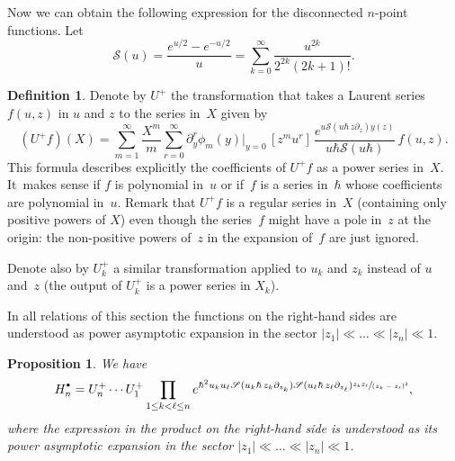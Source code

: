\documentclass[JEP,XML,SOM,Unicode,NoEqCountersInSection,NoFloatCountersInSection]{cedram}
\let\mathcal\mathscr
\newcommand{\sbullet}{{\scriptscriptstyle\bullet}}
\newcommand{\csbullet}{{\raisebox{1pt}{$\sbullet$}}}
\theoremstyle{plain}
\newtheorem{proposition}[theorem]{Proposition}
\theoremstyle{definition}
\newtheorem{definition}[theorem]{Definition}
\theoremstyle{remark}
\newcommand{\cS}{\mathcal{S}}
\newcommand{\Hd}{H^\csbullet}
\begin{document}
Now we can obtain the following expression for the disconnected $n$-point functions. Let
\begin{equation*}
\cS(u)=\frac{e^{u/2}-e^{-u/2}}{u}=\sum_{k=0}^\infty\frac{u^{2k}}{2^{2k}(2k+1)!}.
\end{equation*}

\begin{definition}\label{def:U-operators}
Denote by $U^+$ the transformation that takes a Laurent series $f(u,z)$ in $u$ and $z$ to the series in~$X$ given by
\begin{equation}\label{eq:Uplusdef}
(U^+f)(X)=\sum_{m=1}^\infty \frac{X^{m}}{m}\sum_{r=0}^\infty
\partial_y^{r}\phi_{m}(y)\big|_{y=0}\,[z^mu^r]\,
\frac{e^{ u\cS(u\hbar\,z\partial_z)y(z) }}{u\hbar\cS(u\hbar)}\,f(u,z).
\end{equation}
This formula describes explicitly the coefficients of $U^+f$ as a power series in~$X$. It~makes sense if $f$ is polynomial in~$u$ or if~$f$ is a series in~$\hbar$ whose coefficients are polynomial in~$u$. Remark that $U^+f$ is a regular series in~$X$ (\ie containing only positive powers of $X$) even though the series~$f$ might have a pole in~$z$ at the origin: the non-positive powers of~$z$ in the expansion of~$f$ are just ignored.

Denote also by $U^+_k$ a similar transformation applied to $u_k$ and $z_k$ instead of $u$ and~$z$ (the output of $U^+_k$ is a power series in $X_k$).
\end{definition}

In all relations of this section
the functions on the right-hand sides are understood as power asymptotic expansion in the sector $|z_1|\ll\dots\ll|z_n|\ll1$.

\begin{proposition}\label{prop:HdU}
We have
\begin{equation}\label{eq:Hdprod}
\Hd_n=U^+_n\cdots U^+_1
\prod_{1\le k<\ell\le n}
e^{\hbar^2u_ku_\ell\cS(u_k\hbar\,z_k\partial_{z_k})\cS(u_\ell\hbar\,z_\ell \partial_{z_\ell})
\sfrac{z_k z_\ell}{(z_k-z_\ell)^2}},
\end{equation}
where the expression in the product on the right-hand side is understood as its power asymptotic expansion in the sector $|z_1|\ll\dots\ll|z_n|\ll1$.
\end{proposition}
\end{document}
